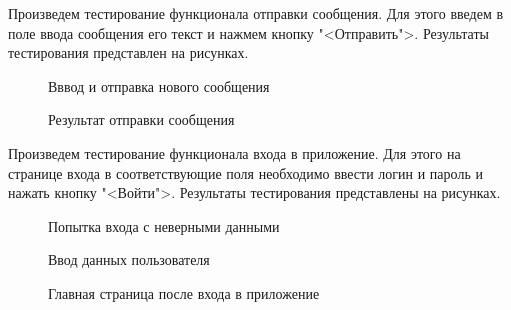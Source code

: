 Произведем тестирование функционала отправки сообщения. Для этого введем в поле ввода сообщения его текст и нажмем кнопку "<Отправить">. Результаты тестирования представлен на рисунках.

\begin{figure}[H]
	\caption{Вввод и отправка нового сообщения}
	\label{newmessage_test1:image}
\end{figure}

\begin{figure}[H]
	\caption{Результат отправки сообщения}
	\label{newmessage_test2:image}
\end{figure}

Произведем тестирование функционала входа в приложение. Для этого на странице входа в соответствующие поля необходимо ввести логин и пароль и нажать кнопку "<Войти">. Результаты тестирования представлены на рисунках.

\begin{figure}[H]
	\caption{Попытка входа с неверными данными}
	\label{signin_test1:image}
\end{figure}

\begin{figure}[H]
	\caption{Ввод данных пользователя}
	\label{signin_test2:image}
\end{figure}

\begin{figure}[H]
	\caption{Главная страница после входа в приложение}
	\label{signin_test3:image}
\end{figure}